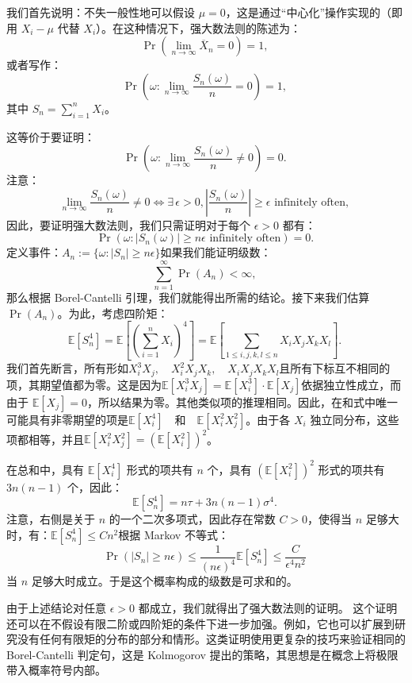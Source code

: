 我们首先说明：不失一般性地可以假设 $\mu = 0$，这是通过“中心化”操作实现的（即用 $X_i - \mu$ 代替 $X_i$）。在这种情况下，强大数法则的陈述为：
$$
\Pr\left(\lim_{n \to \infty} \overline{X}_n = 0\right) = 1,~
$$
或者写作：
$$
\Pr\left(\omega : \lim_{n \to \infty} \frac{S_n(\omega)}{n} = 0\right) = 1,~
$$
其中 $S_n = \sum_{i=1}^n X_i$。

这等价于要证明：
$$
\Pr\left(\omega : \lim_{n \to \infty} \frac{S_n(\omega)}{n} \neq 0\right) = 0.~
$$
注意：
$$
\lim_{n \to \infty} \frac{S_n(\omega)}{n} \neq 0 \iff \exists\, \epsilon > 0, \left|\frac{S_n(\omega)}{n}\right| \geq \epsilon \text{ infinitely often},~
$$
因此，要证明强大数法则，我们只需证明对于每个 $\epsilon > 0$ 都有：
$$
\Pr\left(\omega : |S_n(\omega)| \geq n\epsilon \text{ infinitely often}\right) = 0.~
$$
定义事件：$A_n := \{\omega : |S_n| \geq n\epsilon\}$如果我们能证明级数：
$$
\sum_{n=1}^{\infty} \Pr(A_n) < \infty,~
$$
那么根据 Borel-Cantelli 引理，我们就能得出所需的结论。接下来我们估算 $\Pr(A_n)$。为此，考虑四阶矩：
$$
\mathbb{E}[S_n^4] = \mathbb{E}\left[\left(\sum_{i=1}^n X_i\right)^4\right] = \mathbb{E}\left[\sum_{1 \leq i, j, k, l \leq n} X_i X_j X_k X_l\right].~
$$
我们首先断言，所有形如$X_i^3 X_j, \quad X_i^2 X_j X_k, \quad X_i X_j X_k X_l$且所有下标互不相同的项，其期望值都为零。这是因为$\mathbb{E}[X_i^3 X_j] = \mathbb{E}[X_i^3] \cdot \mathbb{E}[X_j]$依据独立性成立，而由于 $\mathbb{E}[X_j] = 0$，所以结果为零。其他类似项的推理相同。因此，在和式中唯一可能具有非零期望的项是$\mathbb{E}[X_i^4] \quad \text{和} \quad \mathbb{E}[X_i^2 X_j^2]$。由于各 $X_i$ 独立同分布，这些项都相等，并且$\mathbb{E}[X_i^2 X_j^2] = \left( \mathbb{E}[X_i^2] \right)^2$。

在总和中，具有 $\mathbb{E}[X_i^4]$ 形式的项共有 $n$ 个，具有 $\left( \mathbb{E}[X_i^2] \right)^2$ 形式的项共有 $3n(n - 1)$ 个，因此：
$$
\mathbb{E}[S_n^4] = n \tau + 3n(n - 1) \sigma^4.~
$$
注意，右侧是关于 $n$ 的一个二次多项式，因此存在常数 $C > 0$，使得当 $n$ 足够大时，有：$\mathbb{E}[S_n^4] \leq C n^2$根据 Markov 不等式：
$$
\Pr(|S_n| \geq n \epsilon) \leq \frac{1}{(n \epsilon)^4} \mathbb{E}[S_n^4] \leq \frac{C}{\epsilon^4 n^2}~
$$
当 $n$ 足够大时成立。于是这个概率构成的级数是可求和的。

由于上述结论对任意 $\epsilon > 0$ 都成立，我们就得出了强大数法则的证明。
这个证明还可以在不假设有限二阶或四阶矩的条件下进一步加强。例如，它也可以扩展到研究没有任何有限矩的分布的部分和情形。这类证明使用更复杂的技巧来验证相同的 Borel-Cantelli 判定句，这是 Kolmogorov 提出的策略，其思想是在概念上将极限带入概率符号内部。
